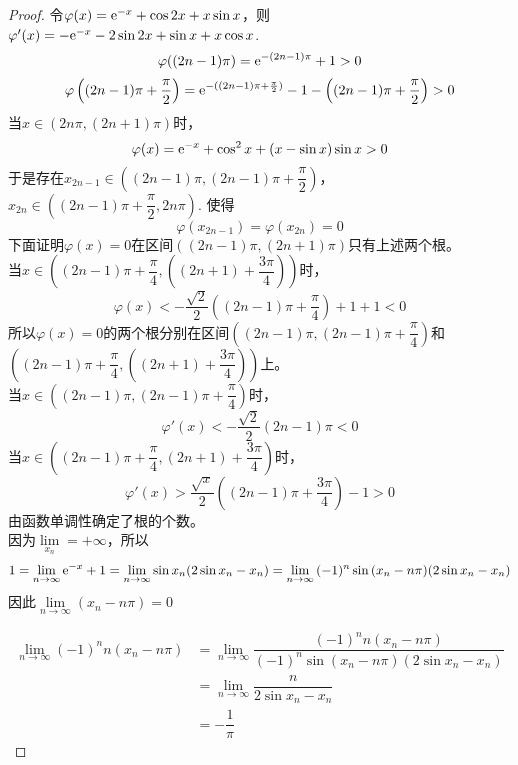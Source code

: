 \begin{proof}

    令$\varphi(x) = \mathrm{e}^{-x} + \cos{2x} + x\sin{x}$，则$\varphi'(x) = -\mathrm{e}^{-x} - 2\sin{2x} + \sin{x} + x\cos{x}$. 
    $$\varphi((2n -1)\pi) = \mathrm{e}^{-(2n -1)\pi} + 1 > 0$$
    $$\varphi\left( (2n -1)\pi + \dfrac{\pi}{2}\right) = \mathrm{e}^{-((2n - 1)\pi + \frac{\pi}{2})} - 1 - \left((2n - 1)\pi + \dfrac{\pi}{2}\right) > 0$$
    当$x \in (2n\pi, (2n + 1)\pi)$时，
    $$\varphi(x) = \mathrm{e}^{-x} + \cos^2{x} + (x - \sin{x})\sin{x} > 0$$
    于是存在$x_{2n - 1} \in \left((2n - 1)\pi, (2n -1)\pi + \dfrac{\pi}{2}\right)$，$x_{2n} \in \left((2n - 1)\pi + \dfrac{\pi}{2}, 2n\pi\right)$. 使得
    $$\varphi(x_{2n - 1}) = \varphi(x_{2n}) = 0$$
    下面证明$\varphi(x) = 0$在区间$((2n -1)\pi, (2n + 1)\pi)$只有上述两个根。\\
    当$x \in \left((2n -1)\pi + \dfrac{\pi}{4}, ((2n + 1) + \dfrac{3\pi}{4})\right)$时，
    $$\varphi(x) < -\dfrac{\sqrt{2}}{2}\left((2n - 1)\pi + \dfrac{\pi}{4}\right) + 1 + 1 < 0$$
    所以$\varphi(x) = 0$的两个根分别在区间$\left((2n - 1)\pi, (2n - 1)\pi + \dfrac{\pi}{4}\right)$和 \\
    $\left((2n -1)\pi + \dfrac{\pi}{4}, ((2n + 1) + \dfrac{3\pi}{4})\right)$上。 \\
    当$x \in \left((2n - 1)\pi, (2n - 1)\pi + \dfrac{\pi}{4}\right)$时，
    $$\varphi'(x) < -\dfrac{\sqrt{2}}{2}(2n - 1)\pi < 0$$ 
    当$x \in \left((2n -1)\pi + \dfrac{\pi}{4}, (2n + 1) + \dfrac{3\pi}{4}\right)$时，
    $$\varphi'(x) > \dfrac{\sqrt{x}}{2} \left((2n -1)\pi + \dfrac{3\pi}{4}\right) - 1 > 0$$
    由函数单调性确定了根的个数。\\
    因为$\lim\limits_{x_n} = + \infty$，所以
    $$1 = \lim\limits_{n \to \infty}{\mathrm{e}^{-x} + 1} = \lim\limits_{n \to \infty}{\sin{x_n}(2\sin{x_n} - x_n)} = \lim\limits_{n \to \infty}{(-1)^n \sin{(x_n - n\pi)}(2\sin{x_n} - x_n)}$$
    因此$\lim\limits_{n \to \infty}{(x_n - n\pi)} = 0$
    
    \begin{align*}
        \lim\limits_{n \to \infty}{(-1)^n n(x_n - n\pi)} & = \lim\limits_{n \to \infty}{\dfrac{(-1)^n n (x_n - n\pi)}{(-1)^n \sin{(x_n - n\pi)}(2\sin{x_n} - x_n)}} \\
        & = \lim\limits_{n \to \infty}{\dfrac{n}{2\sin{x_n} - x_n}} \\
        & = -\dfrac{1}{\pi}
    \end{align*}

\end{proof}

